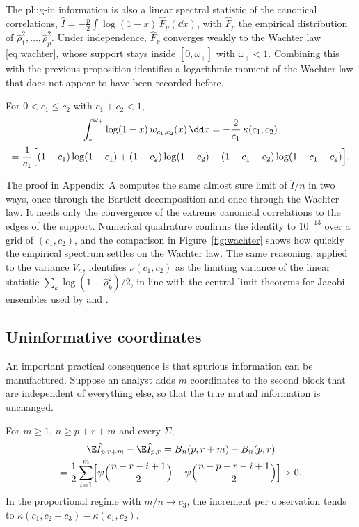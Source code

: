 The plug-in information is also a linear spectral statistic of the canonical correlations, $\hat I=-\tfrac p2\int\log(1-x)\,\hat F_p(\dd x)$, with $\hat F_p$ the empirical distribution of $\hat\rho_1^2,\ldots,\hat\rho_p^2$. Under independence, $\hat F_p$ converges weakly to the Wachter law \eqref{eq:wachter}, whose support stays inside $[0,\omega_+]$ with $\omega_+<1$. Combining this with the previous proposition identifies a logarithmic moment of the Wachter law that does not appear to have been recorded before.

\begin{theorem*}
For $0<c_1\leq c_2$ with $c_1+c_2<1$,
\begin{multline*}
 \int_{\omega_-}^{\omega_+}\log(1-x)\,w_{c_1,c_2}(x)\,\dd x=-\frac2{c_1}\,\kappa(c_1,c_2)\\
 =\frac1{c_1}\Bigl[(1-c_1)\log(1-c_1)+(1-c_2)\log(1-c_2)-(1-c_1-c_2)\log(1-c_1-c_2)\Bigr].
\end{multline*}
\end{theorem*}

The proof in Appendix~A computes the same almost sure limit of $\hat I/n$ in two ways, once through the Bartlett decomposition and once through the Wachter law. It needs only the convergence of the extreme canonical correlations to the edges of the support. Numerical quadrature confirms the identity to $10^{-13}$ over a grid of $(c_1,c_2)$, and the comparison in Figure~\ref{fig:wachter} shows how quickly the empirical spectrum settles on the Wachter law. The same reasoning, applied to the variance $V_n$, identifies $\nu(c_1,c_2)$ as the limiting variance of the linear statistic $\sum_k\log(1-\hat\rho_k^2)/2$, in line with the central limit theorems for Jacobi ensembles used by \citet{jiang2013central} and \citet{yang2015independence}.

\subsection*{Uninformative coordinates}

An important practical consequence is that spurious information can be manufactured. Suppose an analyst adds $m$ coordinates to the second block that are independent of everything else, so that the true mutual information is unchanged.

\begin{proposition*}
For $m\geq1$, $n\ge p+r+m$ and every $\Sigma$,
\begin{multline*}
 \E\hat I_{p,r+m}-\E\hat I_{p,r}=B_n(p,r+m)-B_n(p,r)\\
 =\frac12\sum_{i=1}^{m}\Bigl[\psi\Bigl(\frac{n-r-i+1}2\Bigr)-\psi\Bigl(\frac{n-p-r-i+1}2\Bigr)\Bigr]>0.
\end{multline*}
In the proportional regime with $m/n\to c_3$, the increment per observation tends to $\kappa(c_1,c_2+c_3)-\kappa(c_1,c_2)$.
\end{proposition*}

